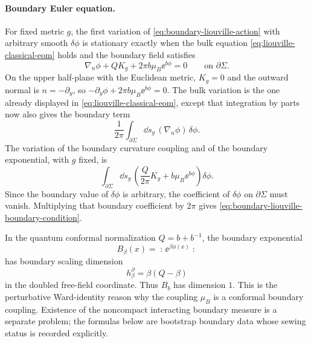 \paragraph{Boundary Euler equation.}
For fixed metric \(g\), the first variation of
\eqref{eq:boundary-liouville-action} with arbitrary smooth
\(\delta\phi\) is stationary exactly when the bulk equation
\eqref{eq:liouville-classical-eom} holds and the boundary field satisfies
\begin{equation}
  \nabla_n\phi+QK_g+2\pi b\mu_B\ee^{b\phi}=0
  \qquad\text{on }\partial\Sigma .
  \label{eq:boundary-liouville-boundary-condition}
\end{equation}
On the upper half-plane with the Euclidean metric, \(K_g=0\) and the outward
normal is \(n=-\partial_y\), so
\(-\partial_y\phi+2\pi b\mu_B\ee^{b\phi}=0\).
The bulk variation is the one already displayed in
\eqref{eq:liouville-classical-eom}, except that integration by parts now
also gives the boundary term
\[
  \frac1{2\pi}\int_{\partial\Sigma}\dd s_g\,(\nabla_n\phi)\,\delta\phi .
\]
The variation of the boundary curvature coupling and of the boundary
exponential, with \(g\) fixed, is
\[
  \int_{\partial\Sigma}\dd s_g\,
  \left(\frac{Q}{2\pi}K_g+b\mu_B\ee^{b\phi}\right)\delta\phi .
\]
Since the boundary value of \(\delta\phi\) is arbitrary, the coefficient of
\(\delta\phi\) on \(\partial\Sigma\) must vanish.  Multiplying that boundary
coefficient by \(2\pi\) gives
\eqref{eq:boundary-liouville-boundary-condition}.

In the quantum conformal normalization \(Q=b+b^{-1}\), the boundary
exponential
\[
  B_\beta(x)=\mathopen{:}\ee^{\beta\phi(x)}\mathclose{:}
\]
has boundary scaling dimension
\begin{equation}
  h^\partial_\beta=\beta(Q-\beta)
  \label{eq:boundary-liouville-boundary-weight}
\end{equation}
in the doubled free-field coordinate.  Thus \(B_b\) has dimension \(1\).
This is the perturbative Ward-identity reason why the coupling \(\mu_B\) is
a conformal boundary coupling.  Existence of the noncompact interacting
boundary measure is a separate problem; the formulas below are bootstrap
boundary data whose sewing status is recorded explicitly.

